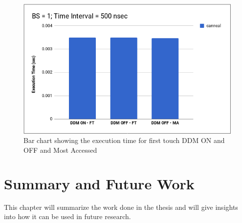 \documentclass{listhesis}
\begin{document}
\begin{figure}
  \includegraphics[width=\linewidth]{FT_DDM_ON_OFF_CANN.png}
  \centering
  \caption{Bar chart showing the execution time for first touch DDM ON and OFF and Most Accessed}
  \label{fig:FT_DDM_ON_OFF_CANN.png}
\end{figure}


\chapter{Summary and Future Work}
This chapter will summarize the work done in the thesis and will give insights into how it can be used in future research. 
\end{document}
